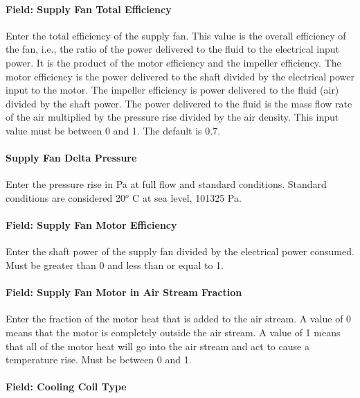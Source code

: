 \paragraph{Field: Supply Fan Total Efficiency}\label{field-supply-fan-total-efficiency}

Enter the total efficiency of the supply fan. This value is the overall efficiency of the fan, i.e., the ratio of the power delivered to the fluid to the electrical input power. It is the product of the motor efficiency and the impeller efficiency. The motor efficiency is the power delivered to the shaft divided by the electrical power input to the motor. The impeller efficiency is power delivered to the fluid (air) divided by the shaft power. The power delivered to the fluid is the mass flow rate of the air multiplied by the pressure rise divided by the air density. This input value must be between 0 and 1. The default is 0.7.

\paragraph{Supply Fan Delta Pressure}\label{supply-fan-delta-pressure}

Enter the pressure rise in Pa at full flow and standard conditions. Standard conditions are considered 20\(^{o}\) C at sea level, 101325 Pa.

\paragraph{Field: Supply Fan Motor Efficiency}\label{field-supply-fan-motor-efficiency}

Enter the shaft power of the supply fan divided by the electrical power consumed. Must be greater than 0 and less than or equal to 1.

\paragraph{Field: Supply Fan Motor in Air Stream Fraction}\label{field-supply-fan-motor-in-air-stream-fraction}

Enter the fraction of the motor heat that is added to the air stream. A value of 0 means that the motor is completely outside the air stream. A value of 1 means that all of the motor heat will go into the air stream and act to cause a temperature rise. Must be between 0 and 1.

\paragraph{Field: Cooling Coil Type}\label{field-cooling-coil-type}

